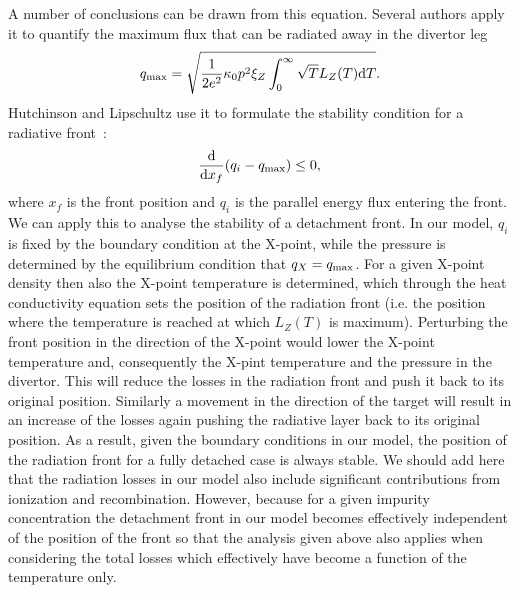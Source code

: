 \documentclass[amsmath,amssymb,a4]{revtex4}
\begin{document}
{A number of conclusions can be drawn from this equation. Several authors apply it to quantify the maximum flux that can be radiated away in the divertor leg \cite{lengyel1981,lackner1993,kallenbach2013,siccinio2016}
\begin{equation}\label{maximum_radiated_flux}
    q_{\rm max} = \sqrt{{1\over2 e^2} \kappa_0 p^2 \xi_Z \int_0^\infty \sqrt{T} L_Z(T) {\rm d}T}.
\end{equation}
Hutchinson and Lipschultz use it to formulate the stability condition for a radiative front~\cite{hutchinson1994,lipschultz2016}:
\begin{equation}
    {{\rm d} \over {\rm d}x_f} (q_i - q_{\rm max}) \le 0,
\end{equation}
where $x_f$ is the front position and $q_i$ is the parallel energy flux entering the front. We can apply this to analyse the stability of a detachment front. In our model, $q_i$ is fixed by the boundary condition at the X-point, while the pressure is determined by the equilibrium condition that $q_X = q_{\rm max}$. For a given X-point density then also the X-point temperature is determined, which through the heat conductivity equation sets the position of the radiation front (i.e. the position where the temperature is reached at which $L_Z(T)$ is maximum). Perturbing the front position in the direction of the X-point would lower the X-point temperature and, consequently the X-pint temperature and the pressure in the divertor. This will reduce the losses in the radiation front and push it back to its original position. Similarly a movement in the direction of the target will result in an increase of the losses again pushing the radiative layer back to its original position. As a result, given the boundary conditions in our model, the position of the radiation front for a fully detached case is always stable. We should add here that the radiation losses in our model also include significant contributions from ionization and recombination. However, because for a given impurity concentration the detachment front in our model becomes effectively independent of the position of the front so that the analysis given above also applies when considering the total losses which effectively have become a function of the temperature only.

}
\end{document}
